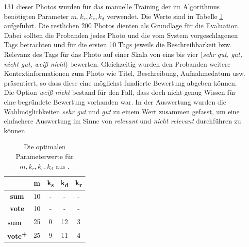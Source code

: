 131 dieser Photos wurden für das manuelle Training der im Algorithmus benötigten Parameter $m,	k_r,	k_s, k_d $ verwendet. Die Werte sind in Tabelle \ref{tab:optimalParameterBjoern} aufgeführt. Die restlichen 200 Photos dienten als Grundlage für die Evaluation. Dabei sollten die Probanden jedes Photo und die vom System vorgeschlagenen Tags betrachten und für die ersten 10 Tags jeweils die Beschreibbarkeit bzw. Relevanz des Tags für das Photo auf einer Skala von eins bis vier (\emph{sehr gut, gut, nicht gut, weiß nicht}) bewerten. Gleichzeitig wurden den Probanden weitere Kontextinformationen zum Photo wie Titel, Beschreibung, Aufnahmedatum usw. präsentiert, so dass diese eine möglichst fundierte Bewertung abgeben können. Die Option \emph{weiß nicht} bestand für den Fall, dass doch nicht genug Wissen für eine begründete Bewertung vorhanden war. In der Auswertung wurden die Wahlmöglichkeiten \emph{sehr gut} und \emph{gut} zu einem Wert zusammen gefasst, um eine einfachere Auswertung im Sinne von \emph{relevant} und \emph{nicht relevant} durchführen zu können.
  
\begin{table}[htbp]
  \centering
  \begin{tabular}{ccccc}
    \hline
     & \textbf{m} & \textbf{k\textsubscript{s}} & \textbf{k\textsubscript{d}} & \textbf{k\textsubscript{r}}\\
    \hline                          
    \textbf{sum} & 10 & - & - & -\\
    \hline                          
    \textbf{vote} & 10 & - & - & -\\
    \hline                          
    \textbf{sum\textsuperscript{+}} & 25 & 0 & 12 & 3\\
    \hline                          
    \textbf{vote\textsuperscript{+}} & 25 & 9 & 11 & 4\\
    \hline
  \end{tabular}
  \caption{Die optimalen Parameterwerte für $m,	k_r,	k_s, k_d$ aus \cite{collectiveKnowledge}.}
  \label{tab:optimalParameterBjoern}
\end{table}



